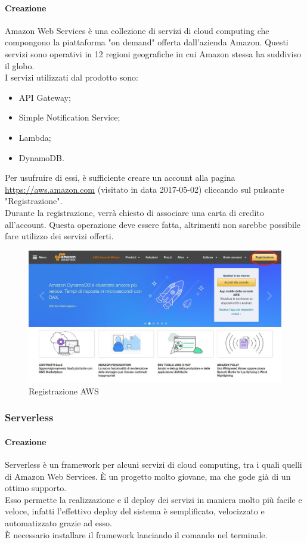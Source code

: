 \paragraph{Creazione}
Amazon Web Services è una collezione di servizi di cloud computing che compongono la piattaforma "on demand" offerta dall'azienda Amazon. Questi servizi sono operativi in 12 regioni geografiche in cui Amazon stessa ha suddiviso il globo.\\
I servizi utilizzati dal prodotto sono:
\begin{itemize}
	\item API Gateway;
	\item Simple Notification Service;
	\item Lambda;
	\item DynamoDB.
\end{itemize}
Per usufruire di essi, è sufficiente creare un account alla pagina \url{https://aws.amazon.com} (visitato in data 2017-05-02) cliccando sul pulsante "Registrazione". \\
Durante la registrazione, verrà chiesto di associare una carta di credito all'account. Questa operazione deve essere fatta, altrimenti non sarebbe possibile fare utilizzo dei servizi offerti.
\begin{figure}[h]
\includegraphics[width=\textwidth,height=\textheight,keepaspectratio]{sezioni/images/aws.jpg}
\caption{Registrazione AWS}
\end{figure}

\subsubsection{Serverless}
\paragraph{Creazione}
Serverless è un framework per alcuni servizi di cloud computing, tra i quali quelli di Amazon Web Services. È un progetto molto giovane, ma che gode già di un ottimo supporto.\\
Esso permette la realizzazione e il deploy dei servizi in maniera molto più facile e veloce, infatti l'effettivo deploy del sistema è semplificato, velocizzato e automatizzato grazie ad esso. \\
È necessario installare il framework lanciando il comando  nel terminale.
